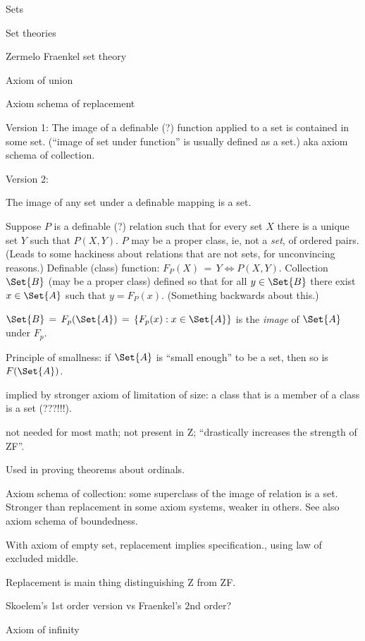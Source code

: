 \begin{plSection}{Sets}
\begin{plSection}{Set theories}
\begin{plSection}{Zermelo Fraenkel set theory}
\begin{plSection}{Axiom of union}
\end{plSection}%
\begin{plSection}{Axiom schema of replacement}
\label{sec:Axiom-schema-of-replacement}

Version 1: 
The image of a definable (?) function applied to a set
is contained in some set.\cite{wiki:AxiomSchemaOfReplacement}
(``image of set under function'' is usually defined as a set.)
aka axiom schema of collection.

Version 2: 

The image of any set under a definable mapping is a set.

Suppose $P$ is a definable (?) relation such that for every
set $X$ there is a unique set $Y$ such that $P(X,Y)$.
$P$ may be a proper class\cite{wiki:ClassSetTheory}, 
ie, not a \textit{set}, of ordered pairs. 
(Leads to some hackiness about relations that are not sets,
for unconvincing reasons\cite{wiki:BinaryRelation}.)
Definable (class) function: $F_P(X)\,=\,Y \iff P(X,Y)$.
Collection $\Set{B}$ (may be a proper class)
defined so that for all $y\in\Set{B}$ there exist $x \in \Set{A}$
such that $y=F_P(x)$.
(Something backwards about this.)

$\Set{B}\,=\,F_p(\Set{A}) \,=\, \{F_p(x) : x \in \Set{A}\}$ 
is the \textsl{image} of $\Set{A}$ under $F_p$.

Principle of smallness: if $\Set{A}$ is 
``small enough'' to be a set,
then so is $F(\Set{A})$.

 implied by stronger
axiom of limitation of 
size\cite{wiki:AxiomOfLimitationOfSize}:
a class that is a member of a class is a set (???!!!).

 not needed for most math;
not present in \textsf{Z};
``drastically increases the strength of \textsf{ZF}''.

Used in proving theorems about ordinals.

Axiom schema of collection: some superclass of 
the image of relation is a set.
Stronger than replacement
in some axiom systems, weaker in others.
See also axiom schema of boundedness.

With axiom of empty set, replacement implies specification.,
using law of excluded middle.

Replacement is main thing distinguishing \textsf{Z}
from \textsf{ZF}.

Skoelem's 1st order version vs Fraenkel's $2$nd order?
\end{plSection}%
\begin{plSection}{Axiom of infinity}
\label{sec:Axiom-of-infinity}


\end{plSection}
\end{plSection}
\end{plSection}
\end{plSection}
